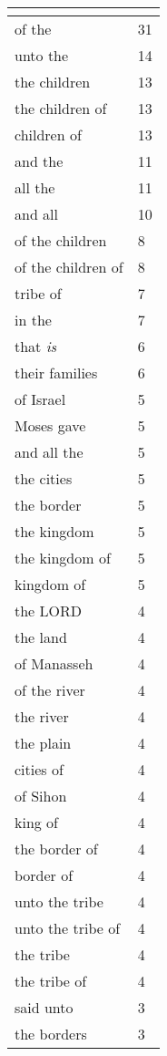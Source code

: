 \begin{center}
\begin{longtable}{|p{3.0in}|p{0.5in}|}
\hline \multicolumn{2}{c}{{ }} \\ \hline
\endfoot 
of the & 31\\ \hline 
unto the & 14\\ \hline 
the children & 13\\ \hline 
the children of & 13\\ \hline 
children of & 13\\ \hline 
and the & 11\\ \hline 
all the & 11\\ \hline 
and all & 10\\ \hline 
of the children & 8\\ \hline 
of the children of & 8\\ \hline 
tribe of & 7\\ \hline 
in the & 7\\ \hline 
that \emph{is} & 6\\ \hline 
their families & 6\\ \hline 
of Israel & 5\\ \hline 
Moses gave & 5\\ \hline 
and all the & 5\\ \hline 
the cities & 5\\ \hline 
the border & 5\\ \hline 
the kingdom & 5\\ \hline 
the kingdom of & 5\\ \hline 
kingdom of & 5\\ \hline 
the LORD & 4\\ \hline 
the land & 4\\ \hline 
of Manasseh & 4\\ \hline 
of the river & 4\\ \hline 
the river & 4\\ \hline 
the plain & 4\\ \hline 
cities of & 4\\ \hline 
of Sihon & 4\\ \hline 
king of & 4\\ \hline 
the border of & 4\\ \hline 
border of & 4\\ \hline 
unto the tribe & 4\\ \hline 
unto the tribe of & 4\\ \hline 
the tribe & 4\\ \hline 
the tribe of & 4\\ \hline 
said unto & 3\\ \hline 
the borders & 3\\ \hline 

\end{longtable}
\end{center}
